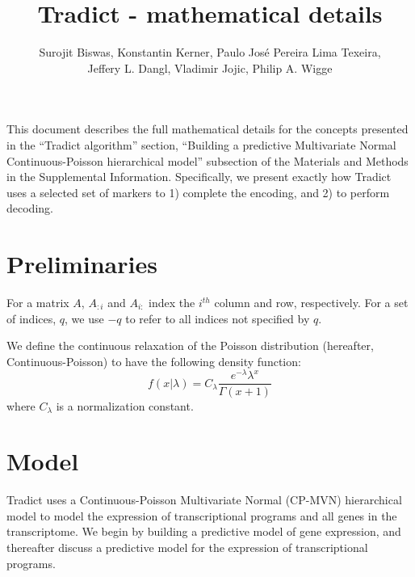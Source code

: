 \documentclass[10pt]{article}
\author{Surojit Biswas, Konstantin Kerner, Paulo Jos\'{e} Pereira Lima Texeira, \\ Jeffery L. Dangl, Vladimir Jojic, Philip A. Wigge}
\date{}
\title{Tradict - mathematical details}
\begin{document}
\maketitle

\tableofcontents
\vspace{10mm}

This document describes the full mathematical details for the concepts presented in the ``Tradict algorithm'' section, ``Building a predictive Multivariate Normal Continuous-Poisson hierarchical model''  subsection of the Materials and Methods in the Supplemental Information. Specifically, we present exactly how Tradict uses a selected set of markers to 1) complete the encoding, and 2) to perform decoding. 

\section{Preliminaries} \label{prelim}

For a matrix $A$, $A_{:i}$ and $A_{i:}$ index the $i^{th}$ column and row, respectively. For a set of indices, $q$, we use $-q$ to refer to all indices not specified by $q$. 

We define the continuous relaxation of the Poisson distribution (hereafter, Continuous-Poisson) to have the following density function:
\[
f(x|\lambda) = C_\lambda \frac{e^{-\lambda} \lambda^x}{\Gamma(x + 1)}
\]
where $C_\lambda$ is a normalization constant.




\section{Model} \label{model}

Tradict uses a Continuous-Poisson Multivariate Normal (CP-MVN) hierarchical model to model the expression of transcriptional programs and all genes in the transcriptome. We begin by building a predictive model of gene expression, and thereafter discuss a predictive model for the expression of transcriptional programs. 
\end{document}
